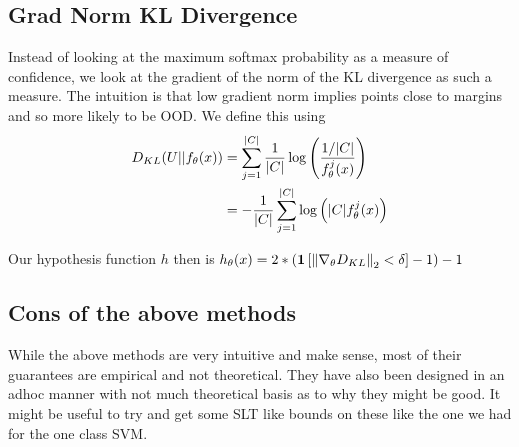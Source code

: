 \documentclass[11pt]{report}
\begin{document}
\subsection{Grad Norm KL Divergence}
Instead of looking at the maximum softmax probability as a measure of confidence, we look at the gradient of the norm of the KL divergence as such a measure. The intuition is that low gradient norm implies points close to margins and so more likely to be OOD. We define this using
\begin{align}
    \begin{aligned}
        D_{KL}(U || f_\theta(x)) &= \sum_{j=1}^{|C|} \frac{1}{|C|} \log \left( \frac{1/|C|}{f_\theta^j(x)} \right)\\
        &= - \frac{1}{|C|} \sum_{j=1}^{|C|}  \log \left( |C|f_\theta^j(x) \right)
    \end{aligned} \nonumber
\end{align}

Our hypothesis function \(h\) then is \(h_\theta(x)= 2 * \left( \mathbf{1} \left[ \left\lVert \nabla_\theta D_{KL} \right\rVert_2 < \delta \right] - 1 \right) -1 \)


 

\subsection{Cons of the above methods}
    While the above methods are very intuitive and make sense, most of their guarantees are empirical and not theoretical. They have also been designed in an adhoc manner with not much theoretical basis as to why they might be good. It might be useful to try and get some SLT like bounds on these like the one we had for the one class SVM.
% 
% 
\end{document}

